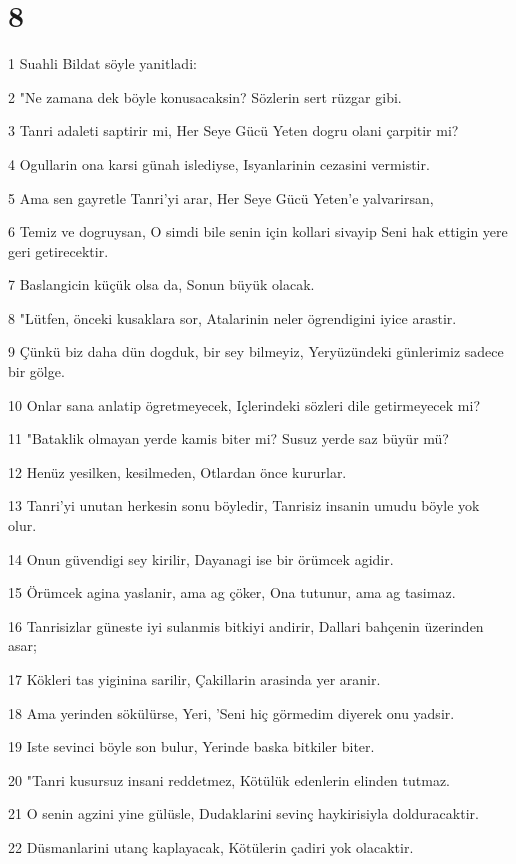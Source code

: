 \chapter{8}

\par 1 Suahli Bildat söyle yanitladi:
\par 2 "Ne zamana dek böyle konusacaksin? Sözlerin sert rüzgar gibi.
\par 3 Tanri adaleti saptirir mi, Her Seye Gücü Yeten dogru olani çarpitir mi?
\par 4 Ogullarin ona karsi günah islediyse, Isyanlarinin cezasini vermistir.
\par 5 Ama sen gayretle Tanri'yi arar, Her Seye Gücü Yeten'e yalvarirsan,
\par 6 Temiz ve dogruysan, O simdi bile senin için kollari sivayip Seni hak ettigin yere geri getirecektir.
\par 7 Baslangicin küçük olsa da, Sonun büyük olacak.
\par 8 "Lütfen, önceki kusaklara sor, Atalarinin neler ögrendigini iyice arastir.
\par 9 Çünkü biz daha dün dogduk, bir sey bilmeyiz, Yeryüzündeki günlerimiz sadece bir gölge.
\par 10 Onlar sana anlatip ögretmeyecek, Içlerindeki sözleri dile getirmeyecek mi?
\par 11 "Bataklik olmayan yerde kamis biter mi? Susuz yerde saz büyür mü?
\par 12 Henüz yesilken, kesilmeden, Otlardan önce kururlar.
\par 13 Tanri'yi unutan herkesin sonu böyledir, Tanrisiz insanin umudu böyle yok olur.
\par 14 Onun güvendigi sey kirilir, Dayanagi ise bir örümcek agidir.
\par 15 Örümcek agina yaslanir, ama ag çöker, Ona tutunur, ama ag tasimaz.
\par 16 Tanrisizlar güneste iyi sulanmis bitkiyi andirir, Dallari bahçenin üzerinden asar;
\par 17 Kökleri tas yiginina sarilir, Çakillarin arasinda yer aranir.
\par 18 Ama yerinden sökülürse, Yeri, 'Seni hiç görmedim diyerek onu yadsir.
\par 19 Iste sevinci böyle son bulur, Yerinde baska bitkiler biter.
\par 20 "Tanri kusursuz insani reddetmez, Kötülük edenlerin elinden tutmaz.
\par 21 O senin agzini yine gülüsle, Dudaklarini sevinç haykirisiyla dolduracaktir.
\par 22 Düsmanlarini utanç kaplayacak, Kötülerin çadiri yok olacaktir.

